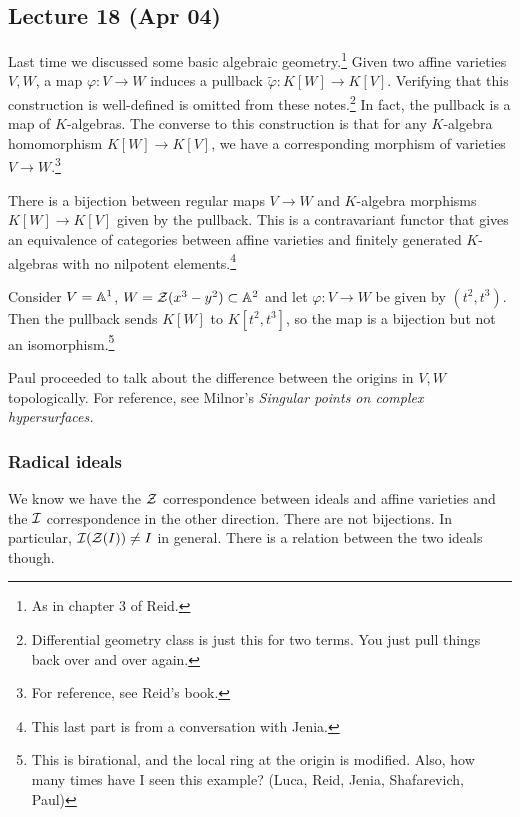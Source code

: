 \documentclass[10pt, twoside]{article}
\begin{document}
        \subsection{Lecture 18 (Apr 04)}
        Last time we discussed some basic algebraic geometry.\footnote{As in chapter 3 of Reid.} Given two affine varieties $V,W$, a map $\varphi:V\to W$ induces a pullback $\widetilde{\varphi}:K[W]\to K[V]$. Verifying that this construction is well-defined is omitted from these notes.\footnote{Differential geometry class is just this for two terms. You just pull things back over and over again.} In fact, the pullback is a map of $K$-algebras. The converse to this construction is that for any $K$-algebra homomorphism $K[W] \to K[V]$, we have a corresponding morphism of varieties $V \to W$.\footnote{For reference, see Reid's book.}

        \begin{thm}
            There is a bijection between regular maps $V \to W$ and $K$-algebra morphisms $K[W] \to K[V]$ given by the pullback. This is a contravariant functor that gives an equivalence of categories between affine varieties and finitely generated $K$-algebras with no nilpotent elements.\footnote{This last part is from a conversation with Jenia.}
        \end{thm}

        \begin{exm}
            Consider $V = \mathbb{A}^1$, $W = \mathcal{Z}(x^3-y^2) \subset \mathbb{A}^2$ and let $\varphi: V \to W$ be given by $(t^2, t^3)$. Then the pullback sends $K[W]$ to $K[t^2,t^3]$, so the map is a bijection but not an isomorphism.\footnote{This is birational, and the local ring at the origin is modified. Also, how many times have I seen this example? (Luca, Reid, Jenia, Shafarevich, Paul)}
        \end{exm}

        Paul proceeded to talk about the difference between the origins in $V,W$ topologically. For reference, see Milnor's \emph{Singular points on complex hypersurfaces.}

        \subsubsection{Radical ideals}
        We know we have the $\mathcal{Z}$ correspondence between ideals and affine varieties and the $\mathcal{I}$ correspondence in the other direction. There are not bijections. In particular, $\mathcal{I}(\mathcal{Z}(I)) \neq I$ in general. There is a relation between the two ideals though.
\end{document}
